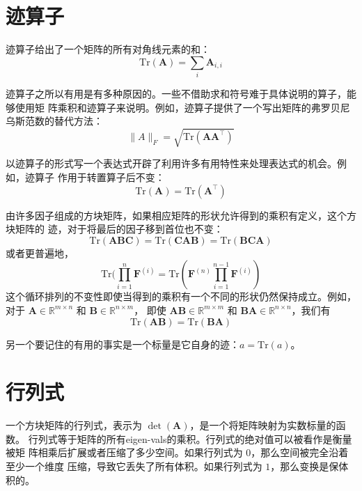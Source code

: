 \section{迹算子}
\label{sec:the_trace_operator}

迹算子给出了一个矩阵的所有对角线元素的和：
\begin{equation}
  \mathrm{Tr}(\pmb{A}) = \sum_i\pmb{A}_{i,i}
\end{equation}

迹算子之所以有用是有多种原因的。一些不借助求和符号难于具体说明的算子，能够使用矩
阵乘积和迹算子来说明。例如，迹算子提供了一个写出矩阵的弗罗贝尼乌斯范数的替代方法：
\begin{equation}
  \|A\|_F = \sqrt{\mathrm{Tr}(\pmb{A}\pmb{A}^{\top})}
\end{equation}

以迹算子的形式写一个表达式开辟了利用许多有用特性来处理表达式的机会。例如，迹算子
作用于转置算子后不变：
\begin{equation}
  \mathrm{Tr}(\pmb{A}) = \mathrm{Tr}(\pmb{A}^{\top})
\end{equation}

由许多因子组成的方块矩阵，如果相应矩阵的形状允许得到的乘积有定义，这个方块矩阵的
迹，对于将最后的因子移到首位也不变：
\begin{equation}
  \mathrm{Tr}(\pmb{A}\pmb{B}\pmb{C}) = \mathrm{Tr}(\pmb{C}\pmb{A}\pmb{B}) =
  \mathrm{Tr}(\pmb{B}\pmb{C}\pmb{A})
\end{equation}
或者更普遍地，
\begin{equation}
  \mathrm{Tr}(\prod^n_{i=1}\pmb{F}^{(i)} =
  \mathrm{Tr}(\pmb{F}^{(n)}\prod^{n-1}_{i=1}\pmb{F}^{(i)})
\end{equation}
这个循环排列的不变性即使当得到的乘积有一个不同的形状仍然保持成立。例如，对于
$\pmb{A} \in \mathbb{R}^{m \times n}$ 和 $\pmb{B} \in \mathbb{R}^{n \times m}$，
即使 $\pmb{A}\pmb{B} \in \mathbb{R}^{m \times m}$ 和 $\pmb{B}\pmb{A} \in
\mathbb{R}^{n \times n}$，我们有
\begin{equation}
  \mathrm{Tr}(\pmb{A}\pmb{B}) = \mathrm{Tr}(\pmb{B}\pmb{A})
\end{equation}

另一个要记住的有用的事实是一个标量是它自身的迹：$a = \mathrm{Tr}(a)$。

\section{行列式}
\label{sec:the_determinant}

一个方块矩阵的行列式，表示为 $\det(\pmb{A})$，是一个将矩阵映射为实数标量的函数。
行列式等于矩阵的所有\gls*{eigen-vals}的乘积。行列式的绝对值可以被看作是衡量被矩
阵相乘后扩展或者压缩了多少空间。如果行列式为 $0$，那么空间被完全沿着至少一个维度
压缩，导致它丢失了所有体积。如果行列式为 $1$，那么变换是保体积的。

